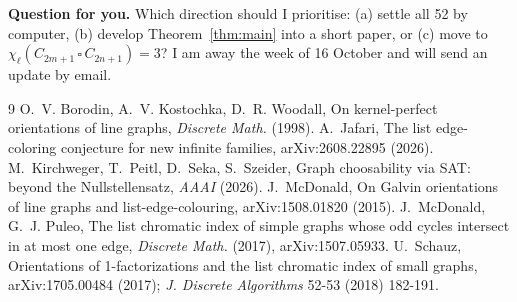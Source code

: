 \documentclass[11pt]{article}
\theoremstyle{plain}
\theoremstyle{definition}
\theoremstyle{remark}
\begin{document}
\noindent\textbf{Question for you.} Which direction should I prioritise: (a) settle all 52 by
computer, (b) develop Theorem~\ref{thm:main} into a short paper, or (c) move to
$\chi_\ell(C_{2m+1} \,\square\, C_{2n+1}) = 3$? I am away the week of 16 October and will send
an update by email.

\begin{thebibliography}{9}
 O.~V. Borodin, A.~V. Kostochka, D.~R. Woodall, On kernel-perfect orientations of
  line graphs, \emph{Discrete Math.} (1998).
 A.~Jafari, The list edge-coloring conjecture for new infinite families,
  arXiv:2608.22895 (2026).
 M.~Kirchweger, T.~Peitl, D.~Seka, S.~Szeider, Graph choosability via SAT: beyond
  the Nullstellensatz, \emph{AAAI} (2026).
 J.~McDonald, On Galvin orientations of line graphs and list-edge-colouring,
  arXiv:1508.01820 (2015).
 J.~McDonald, G.~J. Puleo, The list chromatic index of simple graphs whose odd
  cycles intersect in at most one edge, \emph{Discrete Math.} (2017), arXiv:1507.05933.
 U.~Schauz, Orientations of 1-factorizations and the list chromatic index of
  small graphs, arXiv:1705.00484 (2017); \emph{J. Discrete Algorithms} 52-53 (2018) 182-191.
\end{thebibliography}
\end{document}
